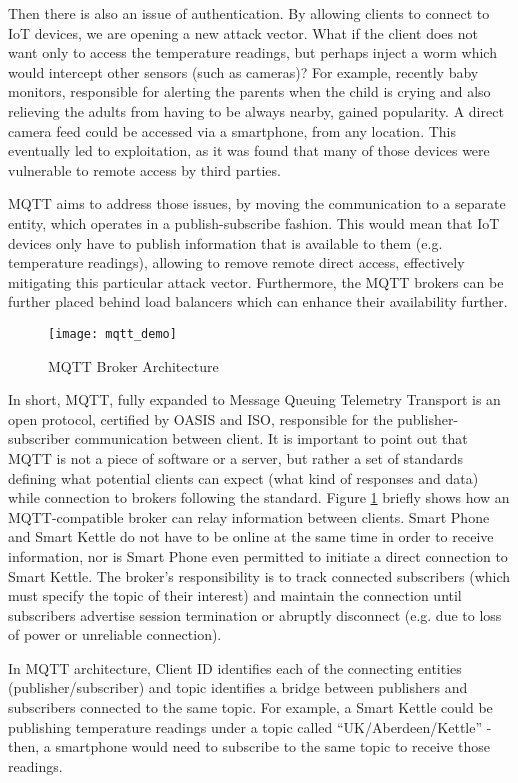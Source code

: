 Then there is also an issue of authentication. By allowing clients to connect to IoT devices, we are opening a new attack vector. What if the client does not want only to access the temperature readings, but perhaps inject a worm which would intercept other sensors (such as cameras)? For example, recently baby monitors, responsible for alerting the parents when the child is crying and also relieving the adults from having to be always nearby, gained popularity. A direct camera feed could be accessed via a smartphone, from any location. This eventually led to exploitation, as it was found that many of those devices were vulnerable to remote access by third parties\cite{pultarova2016webcam}.

MQTT aims to address those issues, by moving the communication to a separate entity, which operates in a publish-subscribe fashion. This would mean that IoT devices only have to publish information that is available to them (e.g. temperature readings), allowing to remove remote direct access, effectively mitigating this particular attack vector. Furthermore, the MQTT brokers can be further placed behind load balancers which can enhance their availability further.

\begin{figure}[ht]
    \centering
    \texttt{[image: mqtt\_demo]}
    \caption{MQTT Broker Architecture}
    \label{fig:mqtt}
\end{figure}

In short, MQTT, fully expanded to Message Queuing Telemetry Transport is an open protocol, certified by OASIS and ISO\cite{banks2019mqtt}, responsible for the publisher-subscriber communication between client. It is important to point out that MQTT is not a piece of software or a server, but rather a set of standards defining what potential clients can expect (what kind of responses and data) while connection to brokers following the standard. Figure \ref{fig:mqtt} briefly shows how an MQTT-compatible broker can relay information between clients. Smart Phone and Smart Kettle do not have to be online at the same time in order to receive information, nor is Smart Phone even permitted to initiate a direct connection to Smart Kettle. The broker's responsibility is to track connected subscribers (which must specify the topic of their interest) and maintain the connection until subscribers advertise session termination or abruptly disconnect (e.g. due to loss of power or unreliable connection).

In MQTT architecture, Client ID identifies each of the connecting entities (publisher/subscriber) and topic identifies a bridge between publishers and subscribers connected to the same topic. For example, a Smart Kettle could be publishing temperature readings under a topic called ``UK/Aberdeen/Kettle'' - then, a smartphone would need to subscribe to the same topic to receive those readings. 

